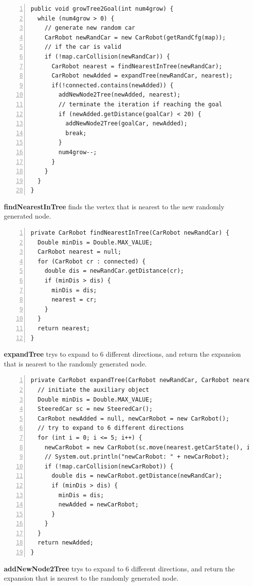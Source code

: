 \documentclass{article}
\begin{document}
\begin{lstlisting}[numbers=left]
public void growTree2Goal(int num4grow) {
  while (num4grow > 0) {
    // generate new random car
    CarRobot newRandCar = new CarRobot(getRandCfg(map));
    // if the car is valid
    if (!map.carCollision(newRandCar)) {
      CarRobot nearest = findNearestInTree(newRandCar);
      CarRobot newAdded = expandTree(newRandCar, nearest);
      if(!connected.contains(newAdded)) {
        addNewNode2Tree(newAdded, nearest);
        // terminate the iteration if reaching the goal
        if (newAdded.getDistance(goalCar) < 20) {
          addNewNode2Tree(goalCar, newAdded);
          break;
        }
        num4grow--;
      }
    }
  }
}
\end{lstlisting}

\textbf{findNearestInTree} finds the vertex that is nearest to the new randomly generated node.

\begin{lstlisting}[numbers=left]
private CarRobot findNearestInTree(CarRobot newRandCar) {
  Double minDis = Double.MAX_VALUE;
  CarRobot nearest = null;
  for (CarRobot cr : connected) {
    double dis = newRandCar.getDistance(cr);
    if (minDis > dis) {
      minDis = dis;
      nearest = cr;
    }
  }
  return nearest;
}
\end{lstlisting}

\textbf{expandTree} trys to expand to 6 different directions, and return the expansion that is nearest to the randomly generated node.

\begin{lstlisting}[numbers=left]
private CarRobot expandTree(CarRobot newRandCar, CarRobot nearest) {
  // initiate the auxiliary object
  Double minDis = Double.MAX_VALUE;
  SteeredCar sc = new SteeredCar();
  CarRobot newAdded = null, newCarRobot = new CarRobot();
  // try to expand to 6 different directions
  for (int i = 0; i <= 5; i++) {
    newCarRobot = new CarRobot(sc.move(nearest.getCarState(), i, 1.));
    // System.out.println("newCarRobot: " + newCarRobot);
    if (!map.carCollision(newCarRobot)) {
      double dis = newCarRobot.getDistance(newRandCar);
      if (minDis > dis) {
        minDis = dis;
        newAdded = newCarRobot;
      }
    }
  }
  return newAdded;
}

\end{lstlisting}

\textbf{addNewNode2Tree} trys to expand to 6 different directions, and return the expansion that is nearest to the randomly generated node.
\end{document}
